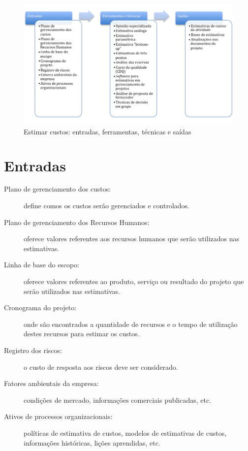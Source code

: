 \begin{figure}[!h]
	\centering
	\includegraphics[scale=0.5]{Figuras/custos_efts_estimar.png}
	\caption{Estimar custos: entradas, ferramentas, técnicas e saídas}
	\label{fig:custos:estimar:efts}
\end{figure}

\section{Entradas}

\begin{description}

	\item[Plano de gerenciamento dos custos:] define comos os custos serão gerenciados e controlados.

	\item[Plano de gerenciamento dos Recursos Humanos:] oferece valores referentes aos recursos humanos que serão utilizados nas estimativas.

	\item[Linha de base do escopo:] oferece valores referentes ao produto, serviço ou resultado do projeto que serão utilizados nas estimativas.

	\item[Cronograma do projeto:] onde são encontrados a quantidade de recursos e o tempo de utilização destes recursos para estimar os custos.

	\item[Registro dos riscos:] o custo de resposta aos riscos deve ser considerado.
	
	\item[Fatores ambientais da empresa:] condições de mercado, informações comerciais publicadas, etc.
	
	\item[Ativos de processos organizacionais:] políticas de estimativa de custos, modelos de estimativas de custos, informações históricas, lições aprendidas, etc.
	
\end{description}

